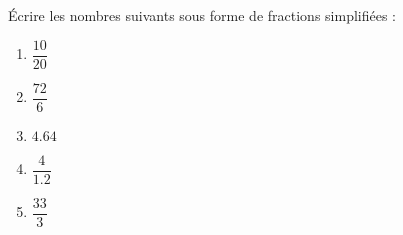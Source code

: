 
\begin{exercice}\label{exosmath-0794}

    Écrire les nombres suivants sous forme de fractions simplifiées :
    \begin{multicols}{2}
        \begin{enumerate}
            \item
                \( \dfrac{ 10 }{ 20 }\)
            \item
                \( \dfrac{ 72 }{ 6 }\)
            \item
                \( 4.64\)
            \item
                \( \dfrac{ 4 }{ 1.2 }\)
            \item
                \( \dfrac{ 33 }{ 3 }\)
        \end{enumerate}
    \end{multicols}

\end{exercice}
